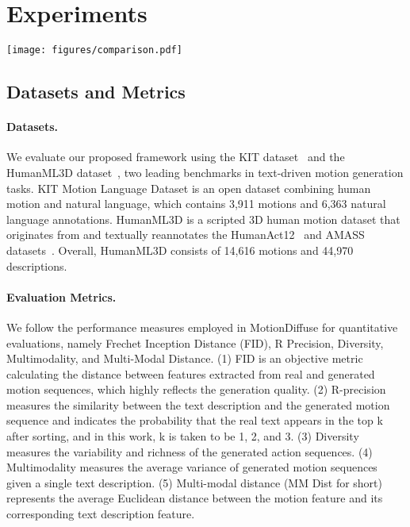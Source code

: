 \documentclass[10pt,twocolumn,letterpaper]{article}
\newcommand{\name}{ReMoDiffuse\xspace}
\begin{document}
 \section{Experiments}
\begin{figure*}[ht]
    \centering
    \texttt{[image: figures/comparison.pdf]}
    \caption{Visual Comparison between previous works and \name. We draw black lines to show the translation path. As for both given conditions, only \name conveys accurate action and path condition.}
    \label{fig:comparison}
\end{figure*}

\subsection{Datasets and Metrics}
\paragraph{Datasets.} We evaluate our proposed framework using the KIT dataset~\cite{plappert2016kit} and the HumanML3D dataset~\cite{guo2022generating}, two leading benchmarks in text-driven motion generation tasks. KIT Motion Language Dataset is an open dataset combining human motion and natural language, which contains 3,911 motions and 6,363 natural language annotations. HumanML3D is a scripted 3D human motion dataset that originates from and textually reannotates the HumanAct12~\cite{guo2020action2motion} and AMASS datasets~\cite{mahmood2019amass}. Overall, HumanML3D consists of 14,616 motions and 44,970 descriptions.
\paragraph{Evaluation Metrics.} We follow the performance measures employed in MotionDiffuse for quantitative evaluations, namely Frechet Inception Distance (FID), R Precision, Diversity, Multimodality, and Multi-Modal Distance. (1) FID is an objective metric calculating the distance between features extracted from real and generated motion sequences, which highly reflects the generation quality. (2) R-precision measures the similarity between the text description and the generated motion sequence and indicates the probability that the real text appears in the top k after sorting, and in this work, k is taken to be 1, 2, and 3. (3) Diversity measures the variability and richness of the generated action sequences. (4) Multimodality measures the average variance of generated motion sequences given a single text description. (5) Multi-modal distance (MM Dist for short) represents the average Euclidean distance between the motion feature and its corresponding text description feature.
\end{document}

